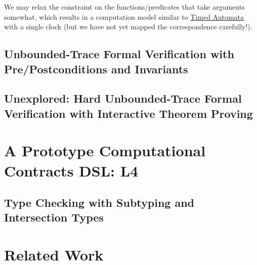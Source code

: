 \documentclass[12pt]{article}
\newcommand{\term}[1]{\EM{\textsf{\hyperref[#1]{#1}}}\xspace}
\newcommand{\timestamp}{\term{timestamp}}
\begin{document}
We may relax the constraint on the functions/predicates that take \timestamp arguments somewhat, which results in a computation model similar to \href{https://drum.lib.umd.edu/bitstream/handle/1903/15232/Fontana_umd_0117E_15027.pdf?sequence=1&isAllowed=y}{Timed Automata} with a single clock (but we have not yet mapped the correspondence carefully!).



\subsection{Unbounded-Trace Formal Verification with Pre/Postconditions and Invariants}

\subsection{Unexplored: Hard Unbounded-Trace Formal Verification with Interactive Theorem Proving}

\section{A Prototype Computational Contracts DSL: L4}

\subsection{Type Checking with Subtyping and Intersection Types} \label{typechecking}


\section{Related Work}
\end{document}

